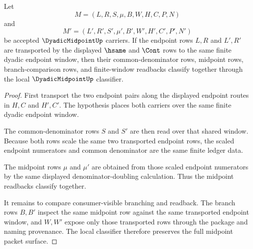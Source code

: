 \begin{theorem}
\label{thm:dyadic-midpoint-endpoint-classifier-stability}
Let
$$
M=(L,R,S,\mu,B,W,H,C,P,N)
$$
and
$$
M'=(L',R',S',\mu',B',W',H',C',P',N')
$$
be accepted $\DyadicMidpointUp$ carriers. If the endpoint rows $L,R$ and $L',R'$ are transported by the displayed $\hsame$ and $\Cont$ rows to the same finite dyadic endpoint window, then their common-denominator rows, midpoint rows, branch-comparison rows, and finite-window readbacks classify together through the local $\DyadicMidpointUp$ classifier.
\end{theorem}
\begin{proof}
First transport the two endpoint pairs along the displayed endpoint routes in $H,C$ and $H',C'$. The hypothesis places both carriers over the same finite dyadic endpoint window.

The common-denominator rows $S$ and $S'$ are then read over that shared window. Because both rows scale the same two transported endpoint rows, the scaled endpoint numerators and common denominator are the same finite ledger data.

The midpoint rows $\mu$ and $\mu'$ are obtained from those scaled endpoint numerators by the same displayed denominator-doubling calculation. Thus the midpoint readbacks classify together.

It remains to compare consumer-visible branching and readback. The branch rows $B,B'$ inspect the same midpoint row against the same transported endpoint window, and $W,W'$ expose only those transported rows through the package and naming provenance. The local classifier therefore preserves the full midpoint packet surface.
\end{proof}

